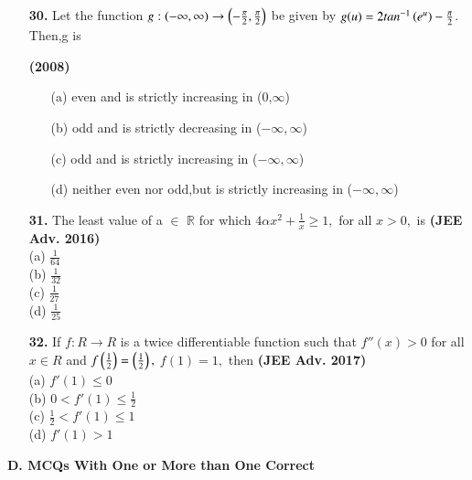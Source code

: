\documentclass[journal,12pt,twocolumn]{IEEEtran}
\theoremstyle{remark}
\begin{document}
\begin{enumerate}
   \item[\textbf{30.}]  Let the function $g:(-\infty,\infty) \rightarrow  \left(-\frac{\pi}{2},\frac{\pi}{2}\right)$ be given by $g(u)= 2 tan^{-1}\left(e^u\right)-\frac{\pi}{2}$. Then,g is  
   
   \hfill{\textbf{(2008)}}
   \begin{enumerate}

   \item[(a)] even and is strictly increasing in (0,$\infty$)
 
   \item[(b)] odd and is strictly decreasing in ($-\infty,\infty$)


   \item[(c)] odd and is strictly increasing in ($-\infty,\infty$)

   \item [(d)]neither even nor odd,but is strictly increasing in ($-\infty,\infty$) \\

\end{enumerate}    
\end{enumerate}
 \begin{enumerate}
     \item [\textbf{31.}] The least value of a $\in$ $\mathbb{R}$ for which $4\alpha x^2 + \frac{1}{x} \ge 1,$ for all $x>0,$ is 
     \hfill{\textbf{(JEE Adv. 2016)}}\\
     (a) $\frac{1}{64}$\\
     (b) $\frac{1}{32}$\\
     (c) $\frac{1}{27}$\\
     (d) $\frac{1}{25}$\\
     \item[\textbf{32.}] If $f: R \rightarrow R$ is a twice differentiable function such that $f''(x)>0$ for all $x \in R$ and $f\left(\frac{1}{2}\right) = \left(\frac{1}{2}\right),$ $f(1)=1,$ then
     \hfill{\textbf{(JEE Adv. 2017)}}\\
     (a) $f'(1) \le 0$ \\
     (b) $0<f'(1) \le \frac{1}{2}$\\
     (c) $\frac{1}{2} < f'(1) \le 1$ \\
     (d) $f'(1) > 1$
     
 \end{enumerate}
 \newpage
 \textbf{D. MCQs With One or More than One Correct}\\
\end{document}
